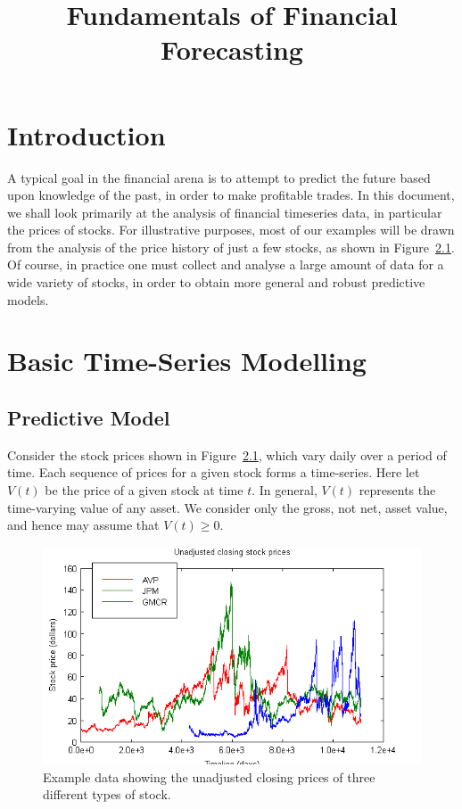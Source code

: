\documentclass[a4paper]{book}
\title{Fundamentals of Financial Forecasting}
\begin{document}
\chapter{Introduction}
A typical goal in the financial arena is to attempt to predict the future based upon knowledge of the past, in order to make profitable trades.
In this document, we shall look primarily at the analysis of financial timeseries data, in particular the prices of stocks.
For illustrative purposes, most of our examples will be drawn from the analysis of the price history of just a few stocks, as shown
in Figure~\ref{fig:stock-prices}. Of course, in practice one must collect and analyse a large amount of data for a wide variety of stocks, 
in order to obtain more general and robust predictive models.

\chapter{Basic Time-Series Modelling}

\section{Predictive Model}
Consider the stock prices shown in Figure~\ref{fig:stock-prices},
which vary daily over a period of time.
Each sequence of prices for a given stock forms a time-series.
Here let $V(t)$ be the price of a given stock at time $t$. In general,
$V(t)$ represents the time-varying value of any asset. We
consider only the gross, not net, asset value, and hence may assume that $V(t)\ge 0$.
\begin{figure}[hbt]
\includegraphics[scale=0.8]{figures/stock-prices-close.png}
\caption{Example data showing the unadjusted closing prices of three different
types of stock.}
\label{fig:stock-prices}
\end{figure}
\end{document}
